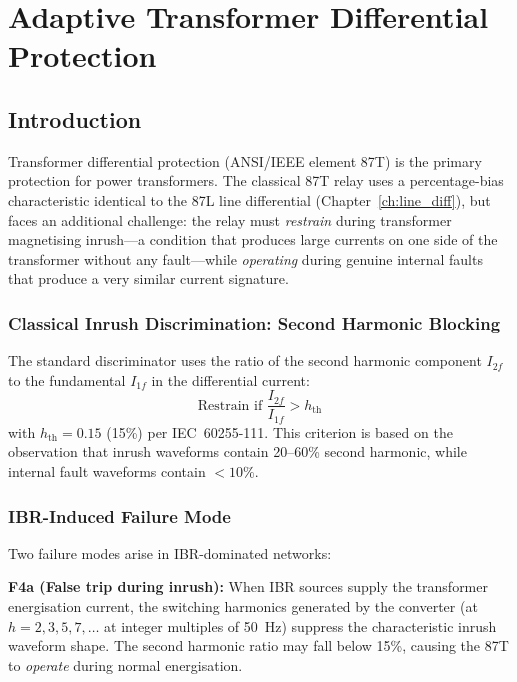 \chapter{Adaptive Transformer Differential Protection}
\label{ch:transformer_diff}

\section{Introduction}
\label{sec:ch6_intro}

Transformer differential protection (ANSI/IEEE element 87T) is the
primary protection for power transformers. The classical 87T relay uses
a percentage-bias characteristic identical to the 87L line differential
(Chapter~\ref{ch:line_diff}), but faces an additional challenge: the
relay must \emph{restrain} during transformer magnetising inrush---a
condition that produces large currents on one side of the transformer
without any fault---while \emph{operating} during genuine internal faults
that produce a very similar current signature.

\subsection{Classical Inrush Discrimination: Second Harmonic Blocking}

The standard discriminator uses the ratio of the second harmonic component
$I_{2f}$ to the fundamental $I_{1f}$ in the differential current:
\begin{equation}
  \text{Restrain if } \frac{I_{2f}}{I_{1f}} > h_\mathrm{th}
  \label{eq:ch6_harmonic_block}
\end{equation}
with $h_\mathrm{th} = 0.15$ (15\%) per IEC~60255-111. This criterion is
based on the observation that inrush waveforms contain 20--60\% second
harmonic, while internal fault waveforms contain $< 10\%$.

\subsection{IBR-Induced Failure Mode}

Two failure modes arise in IBR-dominated networks:

\textbf{F4a (False trip during inrush):} When IBR sources supply the
transformer energisation current, the switching harmonics generated by
the converter (at $h = 2, 3, 5, 7, \ldots$ at integer multiples of
50~Hz) suppress the characteristic inrush waveform shape. The second
harmonic ratio may fall below 15\%, causing the 87T to \emph{operate}
during normal energisation.


